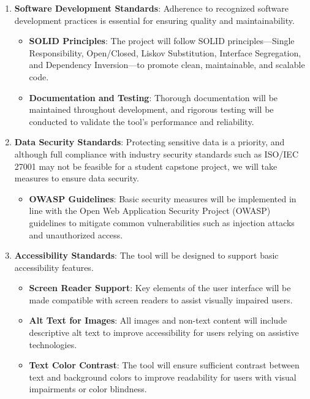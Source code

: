 \documentclass[12pt]{article}
\begin{document}
\begin{enumerate}
    \item \textbf{Software Development Standards}: Adherence to recognized software development practices is essential for ensuring quality and maintainability.
        \begin{itemize}
            \item \textbf{SOLID Principles}: The project will follow SOLID principles—Single Responsibility, 
            Open/Closed, Liskov Substitution, Interface Segregation, and Dependency Inversion—to promote clean,
             maintainable, and scalable code.
            \item \textbf{Documentation and Testing}: Thorough documentation will be maintained throughout 
            development, and rigorous testing will be conducted to validate the tool's performance and reliability.
        \end{itemize}



    \item \textbf{Data Security Standards}: Protecting sensitive data is a priority, and although full 
    compliance with industry security standards such as ISO/IEC 27001 may not be feasible for a student 
    capstone project, we will take measures to ensure data security.
        \begin{itemize}
            \item \textbf{OWASP Guidelines}: Basic security measures will be implemented in line with the 
            Open Web Application Security Project (OWASP) guidelines to mitigate common vulnerabilities such 
            as injection attacks and unauthorized access.
        \end{itemize}


    \item \textbf{Accessibility Standards}: The tool will be designed to support basic accessibility features.
    \begin{itemize}
        \item \textbf{Screen Reader Support}: Key elements of the user interface will be made compatible with 
        screen readers to assist visually impaired users.
        \item \textbf{Alt Text for Images}: All images and non-text content will include descriptive alt text to 
        improve accessibility for users relying on assistive technologies.
        \item \textbf{Text Color Contrast}: The tool will ensure sufficient contrast between text and background 
        colors to improve readability for users with visual impairments or color blindness.
    \end{itemize}
        


\end{enumerate}
\end{document}
